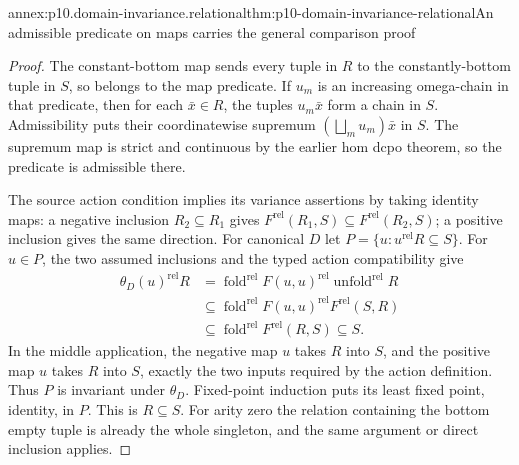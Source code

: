 \begin{annexitem}{annex:p10.domain-invariance.relational}{thm:p10-domain-invariance-relational}{An admissible predicate on maps carries the general comparison proof}
\begin{proof}
The constant-bottom map sends every tuple in \(R\) to the
constantly-bottom tuple in \(S\), so belongs to the map predicate.
If \(u_m\) is an increasing omega-chain in that predicate,
then for each \(\bar x\in R\), the tuples \(u_m\bar x\)
form a chain in \(S\). Admissibility puts their coordinatewise
supremum \((\bigsqcup_m u_m)\bar x\) in \(S\).
The supremum map is strict and continuous by the earlier hom
dcpo theorem, so the predicate is admissible there.

The source action condition implies its variance assertions by
taking identity maps: a negative inclusion \(R_2\subseteq R_1\)
gives \(F^{\mathrm{rel}}(R_1,S)\subseteq
F^{\mathrm{rel}}(R_2,S)\); a positive inclusion gives the
same direction. For canonical \(D\) let
\(P=\{u:u^{\mathrm{rel}}R\subseteq S\}\).
For \(u\in P\), the two assumed inclusions and the typed
action compatibility give
\[
 \begin{aligned}
 \theta_D(u)^{\mathrm{rel}}R
 &=\operatorname{fold}^{\mathrm{rel}}F(u,u)^{\mathrm{rel}}
                 \operatorname{unfold}^{\mathrm{rel}}R\\
 &\subseteq\operatorname{fold}^{\mathrm{rel}}F(u,u)^{\mathrm{rel}}
                       F^{\mathrm{rel}}(S,R)\\
 &\subseteq\operatorname{fold}^{\mathrm{rel}}F^{\mathrm{rel}}(R,S)
 \subseteq S.
 \end{aligned}
\]
In the middle application, the negative map \(u\) takes \(R\)
into \(S\), and the positive map \(u\) takes \(R\) into
\(S\), exactly the two inputs required by the action definition.
Thus \(P\) is invariant under \(\theta_D\). Fixed-point
induction puts its least fixed point, identity, in \(P\).
This is \(R\subseteq S\). For arity zero the relation
containing the bottom empty tuple is already the whole singleton,
and the same argument or direct inclusion applies.
\end{proof}
\end{annexitem}

